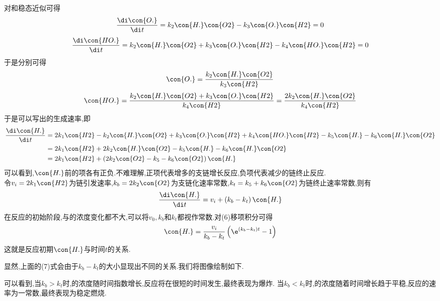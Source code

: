 \documentclass{ctexart}
\begin{document}
\begin{derivation}\setcounter{equation}{0}
    对和稳态近似可得
    \begin{equation}
        \dfrac{\di\con{O.}}{\di t}=k_2\con{H.}\con{O2}-k_3\con{O.}\con{H2}=0
    \end{equation}
    \begin{equation}
        \dfrac{\di\con{HO.}}{\di t}=k_2\con{H.}\con{O2}+k_3\con{O.}\con{H2}-k_4\con{HO.}\con{H2}=0
    \end{equation}
    于是分别可得
    \begin{equation}
        \con{O.}=\dfrac{k_2\con{H.}\con{O2}}{k_3\con{H2}}
    \end{equation}
    \begin{equation}
        \con{HO.}
        =\dfrac{k_2\con{H.}\con{O2}+k_3\con{O.}\con{H2}}{k_4\con{H2}}
        =\dfrac{2k_2\con{H.}\con{O2}}{k_4\con{H2}}
    \end{equation}
    于是可以写出的生成速率,即
    \begin{equation}
        \begin{aligned}
            \dfrac{\di\con{H.}}{\di t}
            &= 2k_1\con{H2}-k_2\con{H.}\con{O2}+k_3\con{O.}\con{H2}+k_4\con{HO.}\con{H2}-k_5\con{H.}-k_6\con{H.}\con{O2} \\
            &= 2k_1\con{H2}+2k_2\con{H.}\con{O2}-k_5\con{H.}-k_6\con{H.}\con{O2} \\
            &= 2k_1\con{H2}+\left(2k_2\con{O2}-k_5-k_6\con{O2}\right)\con{H.}
        \end{aligned}
    \end{equation}
    可以看到,$\con{H.}$前的项各有正负.不难理解,正项代表增多的支链增长反应,负项代表减少的链终止反应.\\
    令$v_i=2k_1\con{H2}$为链引发速率,$k_b=2k_2\con{O2}$为支链化速率常数,$k_t=k_5+k_6\con{O2}$为链终止速率常数,则有
    \begin{equation}
        \dfrac{\di\con{H.}}{\di t}=v_i+\left(k_b-k_t\right)\con{H.}
    \end{equation}
    在反应的初始阶段,与的浓度变化都不大,可以将$v_0,k_b$和$k_t$都视作常数.对(6)移项积分可得
    \begin{equation}
        \con{H.}=\dfrac{v_i}{k_b-k_t}\left(\e^{\left(k_b-k_t\right)t}-1\right)
    \end{equation}
    这就是反应初期$\con{H.}$与时间$t$的关系.
\end{derivation}
显然,上面的(7)式会由于$k_b-k_t$的大小显现出不同的关系.我们将图像绘制如下.
\begin{figure}[H]
    \centering
\end{figure}
可以看到,当$k_b>k_t$时,的浓度随时间指数增长,反应将在很短的时间发生,最终表现为爆炸.%
当$k_b<k_t$时,的浓度随着时间增长趋于平稳,反应的速率为一常数,最终表现为稳定燃烧.
\end{document}
